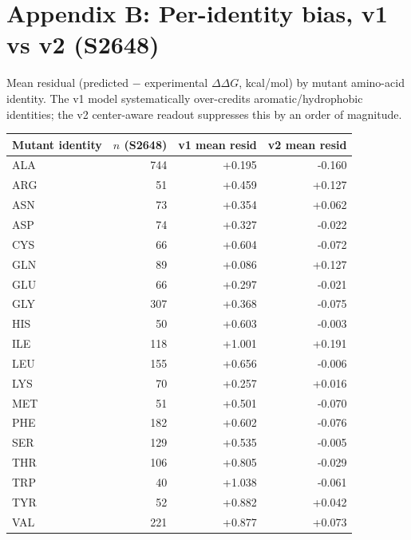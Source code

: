 \section*{Appendix B: Per-identity bias, v1 vs v2 (S2648)}
Mean residual (predicted $-$ experimental $\Delta\Delta G$, kcal/mol) by
mutant amino-acid identity. The v1 model systematically over-credits
aromatic/hydrophobic identities; the v2 center-aware readout suppresses
this by an order of magnitude.
\begin{longtable}{l r r r}
\hline
Mutant identity & $n$ (S2648) & v1 mean resid & v2 mean resid \\ \hline
\endhead
ALA & 744 & +0.195 & -0.160 \\
ARG & 51 & +0.459 & +0.127 \\
ASN & 73 & +0.354 & +0.062 \\
ASP & 74 & +0.327 & -0.022 \\
CYS & 66 & +0.604 & -0.072 \\
GLN & 89 & +0.086 & +0.127 \\
GLU & 66 & +0.297 & -0.021 \\
GLY & 307 & +0.368 & -0.075 \\
HIS & 50 & +0.603 & -0.003 \\
ILE & 118 & +1.001 & +0.191 \\
LEU & 155 & +0.656 & -0.006 \\
LYS & 70 & +0.257 & +0.016 \\
MET & 51 & +0.501 & -0.070 \\
PHE & 182 & +0.602 & -0.076 \\
SER & 129 & +0.535 & -0.005 \\
THR & 106 & +0.805 & -0.029 \\
TRP & 40 & +1.038 & -0.061 \\
TYR & 52 & +0.882 & +0.042 \\
VAL & 221 & +0.877 & +0.073 \\
\hline
\end{longtable}
